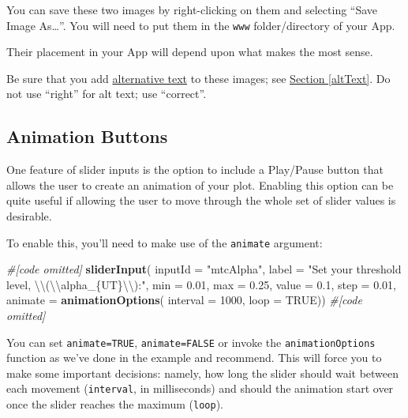 \documentclass[
]{book}
\newenvironment{Shaded}{\begin{snugshade}}{\end{snugshade}}
\newcommand{\CharTok}[1]{\textcolor[rgb]{0.31,0.60,0.02}{#1}}
\newcommand{\CommentTok}[1]{\textcolor[rgb]{0.56,0.35,0.01}{\textit{#1}}}
\newcommand{\DataTypeTok}[1]{\textcolor[rgb]{0.13,0.29,0.53}{#1}}
\newcommand{\DecValTok}[1]{\textcolor[rgb]{0.00,0.00,0.81}{#1}}
\newcommand{\FloatTok}[1]{\textcolor[rgb]{0.00,0.00,0.81}{#1}}
\newcommand{\KeywordTok}[1]{\textcolor[rgb]{0.13,0.29,0.53}{\textbf{#1}}}
\newcommand{\NormalTok}[1]{#1}
\newcommand{\OtherTok}[1]{\textcolor[rgb]{0.56,0.35,0.01}{#1}}
\newcommand{\StringTok}[1]{\textcolor[rgb]{0.31,0.60,0.02}{#1}}
\begin{document}
You can save these two images by right-clicking on them and selecting ``Save Image As\ldots{}''. You will need to put them in the \texttt{www} folder/directory of your App.

Their placement in your App will depend upon what makes the most sense.

Be sure that you add \protect\hyperlink{altText}{alternative text} to these images; see \protect\hyperlink{altText}{Section \ref{altText}}. Do not use ``right'' for alt text; use ``correct''.

\hypertarget{animation-buttons-1}{%
\subsection{Animation Buttons}\label{animation-buttons-1}}

One feature of slider inputs is the option to include a Play/Pause button that allows the user to create an animation of your plot. Enabling this option can be quite useful if allowing the user to move through the whole set of slider values is desirable.

To enable this, you'll need to make use of the \texttt{animate} argument:

\begin{Shaded}
\begin{Highlighting}[]
\CommentTok{#[code omitted]}
\KeywordTok{sliderInput}\NormalTok{(}
  \DataTypeTok{inputId =} \StringTok{"mtcAlpha"}\NormalTok{,}
  \DataTypeTok{label =} \StringTok{"Set your threshold level, }\CharTok{\textbackslash{}\textbackslash{}}\StringTok{(}\CharTok{\textbackslash{}\textbackslash{}}\StringTok{alpha_\{UT\}}\CharTok{\textbackslash{}\textbackslash{}}\StringTok{):"}\NormalTok{,}
  \DataTypeTok{min =} \FloatTok{0.01}\NormalTok{,}
  \DataTypeTok{max =} \FloatTok{0.25}\NormalTok{,}
  \DataTypeTok{value =} \FloatTok{0.1}\NormalTok{,}
  \DataTypeTok{step =} \FloatTok{0.01}\NormalTok{,}
  \DataTypeTok{animate =} \KeywordTok{animationOptions}\NormalTok{(}
    \DataTypeTok{interval =} \DecValTok{1000}\NormalTok{, }\DataTypeTok{loop =} \OtherTok{TRUE}\NormalTok{))}
\CommentTok{#[code omitted]}
\end{Highlighting}
\end{Shaded}

You can set \texttt{animate=TRUE}, \texttt{animate=FALSE} or invoke the \texttt{animationOptions} function as we've done in the example and recommend. This will force you to make some important decisions: namely, how long the slider should wait between each movement (\texttt{interval}, in milliseconds) and should the animation start over once the slider reaches the maximum (\texttt{loop}).
\end{document}
